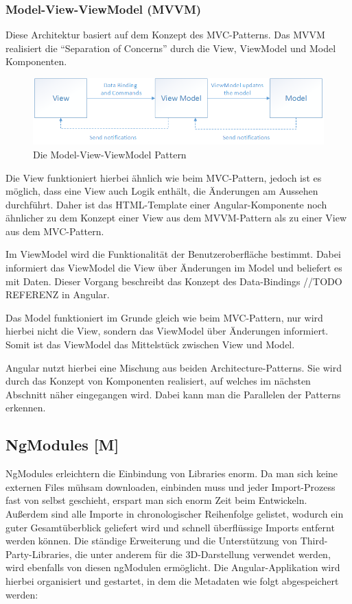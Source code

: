 \subsubsection{Model-View-ViewModel (MVVM)}
Diese Architektur basiert auf dem Konzept des MVC-Patterns. Das MVVM realisiert die “Separation of Concerns” durch die View, ViewModel und Model Komponenten.

\begin{figure} [h t]
  \centering
  \includegraphics[scale=0.5]{pics/mvvm-pattern.png}
  \caption{Die Model-View-ViewModel Pattern \cite{MVVM}}
  \label{fig:tech:front:mvc-architecture}
\end{figure}

Die View funktioniert hierbei ähnlich wie beim MVC-Pattern, jedoch ist es möglich, dass eine View auch Logik enthält, die Änderungen am Aussehen durchführt. Daher ist das HTML-Template einer Angular-Komponente noch ähnlicher zu dem Konzept einer View aus dem MVVM-Pattern als zu einer View aus dem MVC-Pattern. 

Im ViewModel wird die Funktionalität der Benutzeroberfläche bestimmt. Dabei informiert das ViewModel die View über Änderungen im Model und beliefert es mit Daten. Dieser Vorgang beschreibt das Konzept des Data-Bindings //TODO REFERENZ in Angular.  

Das Model funktioniert im Grunde gleich wie beim MVC-Pattern, nur wird hierbei nicht die View, sondern das ViewModel über Änderungen informiert. Somit ist das ViewModel das Mittelstück zwischen View und Model.

Angular nutzt hierbei eine Mischung aus beiden Architecture-Patterns. Sie wird durch das Konzept von Komponenten realisiert, auf welches im nächsten Abschnitt näher eingegangen wird. Dabei kann man die Parallelen der Patterns erkennen.
\cite{MVVM}

\subsection{NgModules [M]}\label{sec:NgModules}
NgModules erleichtern die Einbindung von Libraries enorm. Da man sich keine externen Files mühsam downloaden, einbinden muss und jeder Import-Prozess fast von selbst geschieht, erspart man sich enorm Zeit beim Entwickeln. Außerdem sind alle Importe in chronologischer Reihenfolge gelistet, wodurch ein guter Gesamtüberblick geliefert wird und schnell überflüssige Imports entfernt werden können. Die ständige Erweiterung und die Unterstützung von Third-Party-Libraries, die unter anderem für die 3D-Darstellung verwendet werden, wird ebenfalls von diesen ngModulen ermöglicht. Die Angular-Applikation wird hierbei organisiert und gestartet, in dem die Metadaten wie folgt abgespeichert werden:


